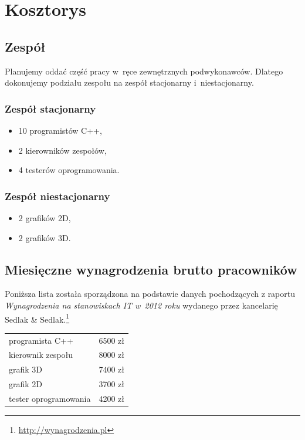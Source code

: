 \documentclass{mwrep}
\begin{document}
\chapter{Kosztorys}

\section{Zespół}

Planujemy oddać część pracy w~ręce zewnętrznych podwykonawców. Dlatego dokonujemy podziału zespołu na zespół stacjonarny i~niestacjonarny.

\subsection{Zespół stacjonarny}

\begin{itemize}
\item 10 programistów C++,
\item 2 kierowników zespołów,
\item 4 testerów oprogramowania.
\end{itemize}

\subsection{Zespół niestacjonarny}

\begin{itemize}
\item 2 grafików 2D,
\item 2 grafików 3D.
\end{itemize}

\section{Miesięczne wynagrodzenia brutto pracowników}

Poniższa lista została sporządzona na podstawie danych pochodzących z raportu \emph{Wynagrodzenia na stanowiskach IT w~2012 roku} wydanego przez kancelarię Sedlak \& Sedlak.\footnote{\url{http://wynagrodzenia.pl}} \\

\begin{tabular}{lr}
programista C++ & 6500 zł \\
kierownik zespołu & 8000 zł \\
grafik 3D & 7400 zł \\
grafik 2D & 3700 zł \\
tester oprogramowania & 4200 zł
\end{tabular}
\end{document}
